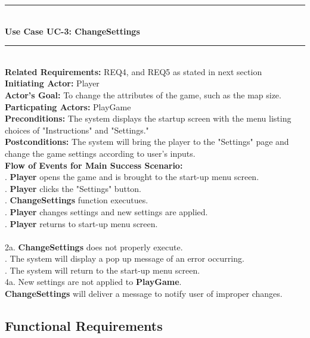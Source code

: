 \documentclass[12pt, titlepage]{article}
\begin{document}
\noindent \rule{400 pt}{1 pt}\\
{\bf Use Case UC-3: ChangeSettings}\\
\rule{400 pt}{1 pt}\\
{\bf Related Requirements:} REQ4, and REQ5 as stated in next section \\
{\bf Initiating Actor:} Player \\
{\bf Actor's Goal:} To change the attributes of the game, such as the map size. \\
{\bf Particpating Actors:} PlayGame \\
{\bf Preconditions:} The system displays the startup screen with the menu listing choices of "Instructions" and "Settings." \\
{\bf Postconditions:} The system will bring the player to the "Settings" page and change the game settings according to user's inputs. \\
{\bf Flow of Events for Main Success Scenario:} \\
. {\bf Player} opens the game and is brought to the start-up menu screen.\\
. {\bf Player} clicks the "Settings" button. \\
. {\bf ChangeSettings} function executues. \\
. {\bf Player} changes settings and new settings are applied.\\
. {\bf Player} returns to start-up menu screen.\\
 \\
\noindent 2a. {\bf ChangeSettings} does not properly execute. \\
. The system will display a pop up message of an error occurring. \\
. The system will return to the start-up menu screen.\\
\noindent 4a. New settings are not applied to {\bf PlayGame}.\\
 {\bf ChangeSettings} will deliver a message to notify user of improper changes.

\subsection{Functional Requirements}
\end{document}
